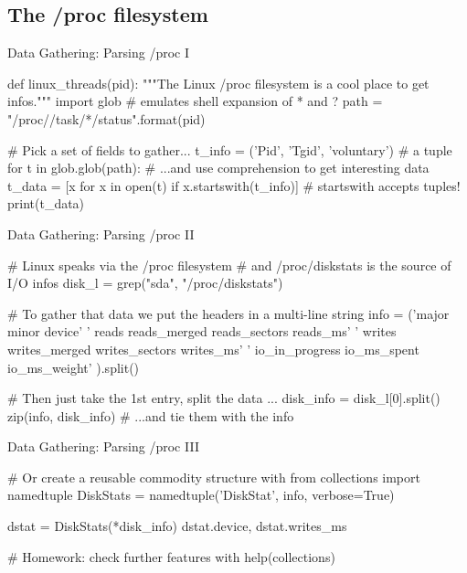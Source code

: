 \subsection{The /proc filesystem}
\begin{frame}[fragile]{Data Gathering: Parsing /proc I}
\begin{pythoncode}

def linux_threads(pid):
  """The Linux /proc filesystem is a cool place 
      to get infos."""
  import glob # emulates shell expansion of * and ?
  path = "/proc/{}/task/*/status".format(pid)
  
  # Pick a set of fields to gather...
  t_info = ('Pid', 'Tgid', 'voluntary') # a tuple
  for t in glob.glob(path):
    # ...and use comprehension to get interesting data
    t_data = [x for x in open(t) 
        if x.startswith(t_info)] # startswith accepts tuples!
    print(t_data)
\end{pythoncode}
\end{frame}



\begin{frame}[fragile]{Data Gathering: Parsing /proc II}
\begin{pythoncode}
# Linux speaks via the /proc filesystem
#  and /proc/diskstats is the source of I/O infos
disk_l = grep("sda", "/proc/diskstats")

# To gather that data we put the headers in a multi-line string
info = ('major minor device'
        ' reads reads_merged reads_sectors reads_ms'
        ' writes writes_merged writes_sectors writes_ms'
        ' io_in_progress io_ms_spent io_ms_weight'
        ).split()

# Then just take the 1st entry, split the data ...
disk_info = disk_l[0].split()
zip(info, disk_info)    # ...and tie them with the info

\end{pythoncode}
\end{frame}

\begin{frame}[fragile]{Data Gathering: Parsing /proc III}
\begin{pythoncode}
# Or create a reusable commodity structure with
from collections import namedtuple
DiskStats = namedtuple('DiskStat', info, verbose=True)

dstat = DiskStats(*disk_info)
dstat.device, dstat.writes_ms

# Homework: check further features with
help(collections) 
\end{pythoncode}
\end{frame}


\iffalse
\begin{frame}[fragile]{Data Gathering: subprocess}
\begin{pythoncode}
# foo
\end{pythoncode}
\end{frame}

\fi
